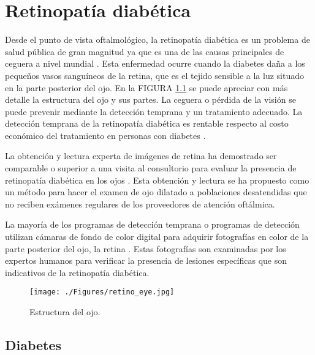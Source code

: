 \newpage{\ } 
\thispagestyle{empty} 

\chapter{Retinopatía diabética}


Desde el punto de vista oftalmológico, la retinopatía diabética es un problema de salud pública de gran magnitud ya que es una de las causas principales de ceguera a nivel mundial \cite{nei}. Esta enfermedad ocurre cuando la diabetes daña a los pequeños vasos sanguíneos de la retina, que es el tejido sensible a la luz situado en la parte posterior del ojo. En la FIGURA  \ref{fig:retino_eye} se puede apreciar con más detalle la estructura del ojo y sus partes.
La ceguera o pérdida de la visión se puede prevenir mediante la detección temprana y un tratamiento adecuado. La detección temprana de la retinopatía diabética es rentable respecto al costo económico  del tratamiento en personas con diabetes \cite{fong9394vision}. %

La obtención y lectura experta de imágenes de retina  ha demostrado ser comparable o superior a una visita al consultorio para evaluar la presencia de retinopatía diabética en los ojos \cite{lin2002sensitivity}. Esta obtención y lectura se ha propuesto como un método para hacer el examen de ojo dilatado a poblaciones desatendidas que no reciben exámenes regulares de los proveedores de atención oftálmica. 

La mayoría de los programas de detección temprana o programas de detección utilizan cámaras de fondo de color digital para adquirir fotografías en color de la parte posterior del ojo, la retina \cite{jose2003camara}. Estas fotografías son examinadas por los expertos humanos para verificar la presencia de lesiones específicas que son indicativos de la retinopatía diabética.


    \begin{figure}[!hbtp]
	\centering
		\texttt{[image: ./Figures/retino\_eye.jpg]}
	\caption{Estructura del ojo.}
	\label{fig:retino_eye}
\end{figure}

\section{Diabetes}

